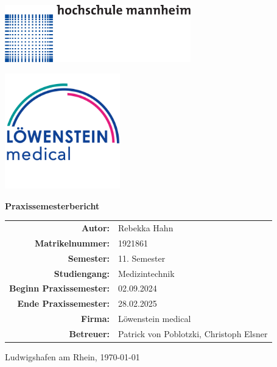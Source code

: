 \documentclass[a4paper, 12pt]{article}
\begin{document}
\begin{titlepage}
	\centering

    \begin{minipage}{0.1\textwidth}
        \includegraphics[height=2.5cm]
        {Hochschule_Mannheim_logo.png}
    \end{minipage}
    \hfill 
    \begin{minipage}{0.25\textwidth}
        \includegraphics[height=5cm]
        {loewenstein_logo.png}
    \end{minipage}	

    \vspace{2.5cm} %
	
	{\Huge\bfseries Praxissemesterbericht \par}
    \vspace{2cm} %

    \begin{tabular}{ r  l }
        \textbf{Autor:} & Rebekka Hahn \\
        \textbf{Matrikelnummer:} & 1921861 \\
        \textbf{Semester:} & 11. Semester \\
        \textbf{Studiengang:} & Medizintechnik \\
        \textbf{Beginn Praxissemester:} & 02.09.2024 \\
        \textbf{Ende Praxissemester:} & 28.02.2025 \\
        \textbf{Firma:} & Löwenstein medical \\
        \textbf{Betreuer:} & Patrick von Poblotzki, Christoph Elsner \\
    \end{tabular}
    
    \vfill %

    {\large Ludwigshafen am Rhein, \today \par}

\end{titlepage}
\end{document}
